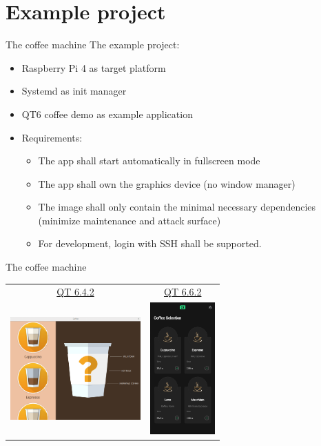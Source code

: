 \documentclass{beamer}
\begin{document}
\section{Example project}

\begin{frame}{The coffee machine}
	The example project:
	\begin{itemize}
		\item Raspberry Pi 4 as target platform
		\item Systemd as init manager
		\item QT6 coffee demo as example application
		\item Requirements:
		\begin{itemize}
			\item The app shall start automatically in fullscreen mode
			\item The app shall own the graphics device (no window manager)
			\item The image shall only contain the minimal necessary dependencies (minimize maintenance and attack surface)
			\item For development, login with SSH shall be supported.
		\end{itemize}
	\end{itemize}
\end{frame}

\begin{frame}{The coffee machine}
	\begin{tabular}{cc}
		\href{https://github.com/qt/qtdoc/tree/v6.4.2/examples/demos/coffee}{QT 6.4.2} &
		\href{https://github.com/qt/qtdoc/tree/v6.6.2/examples/demos/coffee}{QT 6.6.2} \\
		\includegraphics[width=5cm]{assets/coffee_machine_qt_6-4-2.png} &
		\includegraphics[width=2.5cm]{assets/coffee_machine_qt_6-6-2.png} \\
	\end{tabular}
\end{frame}
\end{document}
